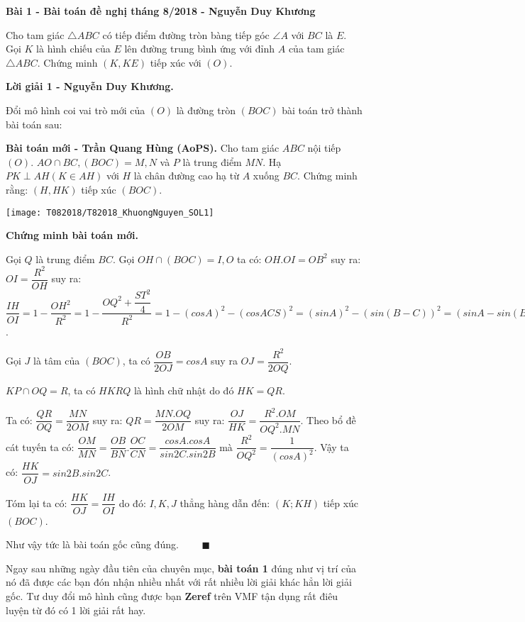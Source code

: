 \begin{framed}\noindent
	
	\textbf{Bài 1 - Bài toán đề nghị tháng 8/2018 - Nguyễn Duy Khương}
	
	Cho tam giác $\triangle ABC$ có tiếp điểm đường tròn bàng tiếp góc $\angle A$ với $BC$ là $E$. Gọi $K$ là hình chiếu của $E$ lên đường trung bình ứng với đỉnh $A$ của tam giác $\triangle ABC$. Chứng minh $(K, KE)$ tiếp xúc với $(O)$.

	
\end{framed}

\textbf{Lời giải 1 - Nguyễn Duy Khương.}

Đổi mô hình coi vai trò mới của $(O)$ là đường tròn $(BOC)$ bài toán trở thành bài toán sau: 

\textbf{Bài toán mới - Trần Quang Hùng (AoPS).} Cho tam giác $ABC$ nội tiếp $(O)$. $AO\cap BC,(BOC)=M,N$ và $P$ là trung điểm $MN$. Hạ $PK\perp AH(K\in AH)$ với $H$ là chân đường cao hạ từ $A$ xuống $BC$. Chứng minh rằng: $(H,HK)$ tiếp xúc $(BOC)$.

\begin{center}
	\texttt{[image: T082018/T82018\_KhuongNguyen\_SOL1]}
	
\end{center}

\textbf{Chứng minh bài toán mới.}

Gọi $Q$ là trung điểm $BC$. Gọi $OH\cap (BOC)=I,O$ ta có: $OH.OI=OB^2$ suy ra: $OI=\dfrac{R^2}{OH}$ suy ra: $\dfrac{IH}{OI}=1-\dfrac{OH^2}{R^2}=1-\dfrac{OQ^2+\dfrac{ST^2}{4}}{R^2}
=1-(cos{A})^2-(cos{ACS})^2=(sin{A})^2-(sin(B-C))^2=(sinA-sin(B-C))(sinA+sin{(B-C)})=sin2B.sin2C$.

Gọi $J$ là tâm của $(BOC)$, ta có $\dfrac{OB}{2OJ}=cosA$ suy ra  $OJ=\dfrac{R^2}{2OQ}$. 

$KP\cap OQ = R$, ta có $HKRQ$ là hình chữ nhật do đó $HK=QR$.

Ta có: $\dfrac{QR}{OQ}=\dfrac{MN}{2OM}$ suy ra: $QR=\dfrac{MN.OQ}{2OM}$ suy ra: $\dfrac{OJ}{HK}=\dfrac{R^2.OM}{OQ^2.MN}$. Theo bổ đề cát tuyến ta có: $\dfrac{OM}{MN}=\dfrac{OB}{BN}.\dfrac{OC}{CN}=
\dfrac{cosA.cosA}{sin2C.sin2B}$ mà $\dfrac{R^2}{OQ^2}=\dfrac{1}{(cos{A})^2}$. Vậy ta có: $\dfrac{HK}{OJ}=sin2B.sin2C$.  

Tóm lại ta có: $\dfrac{HK}{OJ}=\dfrac{IH}{OI}$ do đó: $I,K,J$ thẳng hàng dẫn đến: $(K;KH)$ tiếp xúc $(BOC)$.

Như vậy tức là bài toán gốc cũng đúng. $\qquad \blacksquare$

Ngay sau những ngày đầu tiên của chuyên mục, \textbf{bài toán 1} đúng như vị trí của nó đã được các bạn đón nhận nhiều nhất với rất nhiều lời giải khác hẳn lời giải gốc. Tư duy đổi mô hình cũng được bạn \textbf{Zeref} trên VMF tận dụng rất điêu luyện từ đó có 1 lời giải rất hay.

